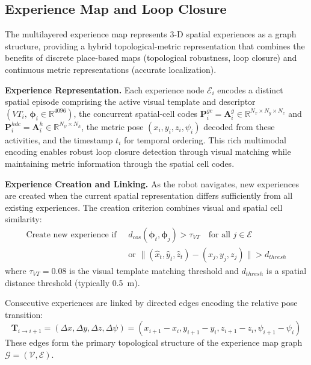 \subsection{Experience Map and Loop Closure}

The multilayered experience map represents 3-D spatial experiences as a graph structure, providing a hybrid topological-metric representation that combines the benefits of discrete place-based maps (topological robustness, loop closure) and continuous metric representations (accurate localization).

\textbf{Experience Representation.} Each experience node $\mathcal{E}_i$ encodes a distinct spatial episode comprising the active visual template and descriptor $(VT_i,\,\boldsymbol{\phi}_i\in\mathbb{R}^{4096})$, the concurrent spatial-cell codes $\mathbf{P}^{gc}_i=\mathbf{A}^{g}_i\in\mathbb{R}^{N_x\times N_y\times N_z}$ and $\mathbf{P}^{hdc}_i=\mathbf{A}^{h}_i\in\mathbb{R}^{N_\psi\times N_h}$, the metric pose $(x_i, y_i, z_i, \psi_i)$ decoded from these activities, and the timestamp $t_i$ for temporal ordering.
This rich multimodal encoding enables robust loop closure detection through visual matching while maintaining metric information through the spatial cell codes.

\textbf{Experience Creation and Linking.} As the robot navigates, new experiences are created when the current spatial representation differs sufficiently from all existing experiences. The creation criterion combines visual and spatial cell similarity:
\begin{equation}
    \begin{aligned}
        \text{Create new experience if }\; & d_{cos}(\boldsymbol{\phi}_t, \boldsymbol{\phi}_j) > \tau_{VT} \quad \text{for all } j \in \mathcal{E} \\
                                           & \text{or } \lVert (\hat{x}_t, \hat{y}_t, \hat{z}_t) - (x_j, y_j, z_j) \rVert > d_{thresh}
    \end{aligned}
\end{equation}
where $\tau_{VT} = 0.08$ is the visual template matching threshold and $d_{thresh}$ is a spatial distance threshold (typically 0.5~m).

Consecutive experiences are linked by directed edges encoding the relative pose transition:
\begin{equation}
    \mathbf{T}_{i \to i+1} = (\Delta x, \Delta y, \Delta z, \Delta \psi) = (x_{i+1} - x_i, y_{i+1} - y_i, z_{i+1} - z_i, \psi_{i+1} - \psi_i)
\end{equation}
These edges form the primary topological structure of the experience map graph $\mathcal{G} = (\mathcal{V}, \mathcal{E})$.

